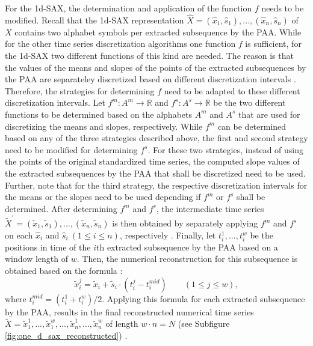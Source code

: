 For the \ac{1d-SAX}, the determination and application of the function $f$ needs to be modified. Recall that the \ac{1d-SAX} representation $\hat{X} = (\hat{x}_1,\hat{s}_1), ..., (\hat{x}_n,\hat{s}_n)$ of $X$ contains two alphabet symbols per extracted subsequence by the \ac{PAA}. While for the other time series discretization algorithms one function $f$ is sufficient, for the \ac{1d-SAX} two different functions of this kind are needed. The reason is that the values of the means and slopes of the points of the extracted subsequences by the \ac{PAA} are separateley discretized based on different discretization intervals \cite{1d-SAX}. Therefore, the strategies for determining $f$ need to be adapted to these different discretization intervals. Let $f^m: A^m \rightarrow \mathbb{R}$ and $f^s: A^s \rightarrow \mathbb{R}$ be the two different functions to be determined based on the alphabets $A^m$ and $A^s$ that are used for discretizing the means and slopes, respectively. While $f^m$ can be determined based on any of the three strategies described above, the first and second strategy need to be modified for determining $f^s$. For these two strategies, instead of using the points of the original standardized time series, the computed slope values of the extracted subsequences by the \ac{PAA} that shall be discretized need to be used. Further, note that for the third strategy, the respective discretization intervals for the means or the slopes need to be used depending if $f^m$ or $f^s$ shall be determined. After determining $f^m$ and $f^s$, the intermediate time series $\tilde{X}^{'} = (\tilde{x}_1,\tilde{s}_1), ..., (\tilde{x}_n,\tilde{s}_n)$ is then obtained by separately applying $f^m$ and $f^s$ on each $\hat{x}_i$ and $\hat{s}_i \ (1 \leq i \leq n)$, respectively \cite{1d-SAX}. \newline
Finally, let $t_{i}^{1}, ..., t_{i}^{w}$ be the positions in time of the $i$th extracted subsequence by the \ac{PAA} based on a window length of $w$. Then, the numerical reconstruction for this subsequence is obtained based on the formula \cite{1d-SAX}:
\begin{equation*}
\tilde{x}_{i}^{j} = \tilde{x}_i + \tilde{s}_i \cdot (t_{i}^{j} - t_{i}^{mid}) \qquad (1 \leq j \leq w),
\end{equation*}
where $t_{i}^{mid} = (t_{i}^{1} + t_{i}^{w}) / 2$. Applying this formula for each extracted subsequence by the \ac{PAA}, results in the final reconstructed numerical time series $\tilde{X} = \tilde{x}_{1}^{1}, ...,\tilde{x}_{1}^{w}, ...,\tilde{x}_{n}^{1}, ...,\tilde{x}_{n}^{w}$ of length $w \cdot n = N$ (see Subfigure \ref{fig:one_d_sax_reconstructed}) \cite{1d-SAX}.
